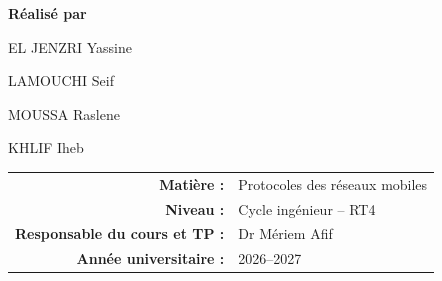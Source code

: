 \documentclass[12pt,a4paper]{report}
\begin{document}
\begin{titlepage}
\vspace{.75cm}
{\Large\textbf{Réalisé par}\par}
\vspace{.25cm}

{\Large EL JENZRI Yassine\par}
\vspace{.08cm}
{\Large LAMOUCHI Seif\par}
\vspace{.08cm}
{\Large MOUSSA Raslene\par}
\vspace{.08cm}
{\Large KHLIF Iheb\par}

\vfill

\begin{tabular}{rl}
\textbf{Matière :} & Protocoles des réseaux mobiles\\
\textbf{Niveau :} & Cycle ingénieur -- RT4\\
\textbf{Responsable du cours et TP :} & Dr Mériem Afif\\
\textbf{Année universitaire :} & 2026--2027
\end{tabular}

\vspace{.45cm}

\end{titlepage}


\setcounter{page}{1}
\tableofcontents
\clearpage
{}





\end{document}
